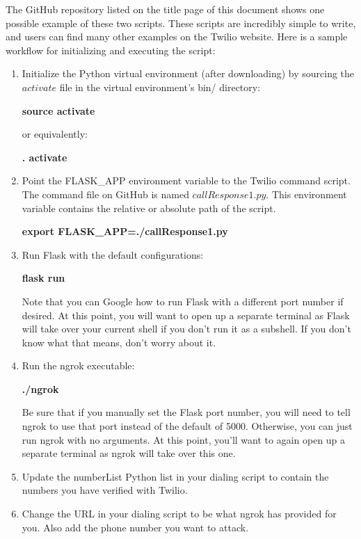 \documentclass[10pt]{report}
\newcommand\tab[1][1cm]{\hspace*{#1}}
\begin{document}
The GitHub repository listed on the title page of this document shows one possible example of these two scripts. These scripts are incredibly simple to write, and users can find many other examples on the Twilio website. Here is a sample workflow for initializing and executing the script: 

\begin{enumerate}
    \item Initialize the Python virtual environment (after downloading) by sourcing the $activate$ file in the virtual environment's bin/ directory:
    
\tab \textbf{source activate}
    
or equivalently:
    
\tab \textbf{. activate}
    
    \item Point the FLASK\_APP environment variable to the Twilio command script. The command file on GitHub is named $callResponse1.py$. This environment variable contains the relative or absolute path of the script.
    
    \tab \textbf{export FLASK\_APP=./callResponse1.py}
    
    \item Run Flask with the default configurations:
    
    \tab \textbf{flask run}
    
    Note that you can Google how to run Flask with a different port number if desired. At this point, you will want to open up a separate terminal as Flask will take over your current shell if you don't run it as a subshell. If you don't know what that means, don't worry about it.
    
    \item Run the ngrok executable:
    
    \tab \textbf{./ngrok}
    
    Be sure that if you manually set the Flask port number, you will need to tell ngrok to use that port instead of the default of 5000. Otherwise, you can just run ngrok with no arguments. At this point, you'll want to again open up a separate terminal as ngrok will take over this one.
    
    \item Update the numberList Python list in your dialing script to contain the numbers you have verified with Twilio.
    
    \item Change the URL in your dialing script to be what ngrok has provided for you. Also add the phone number you want to attack.
    

\end{enumerate}
\end{document}
